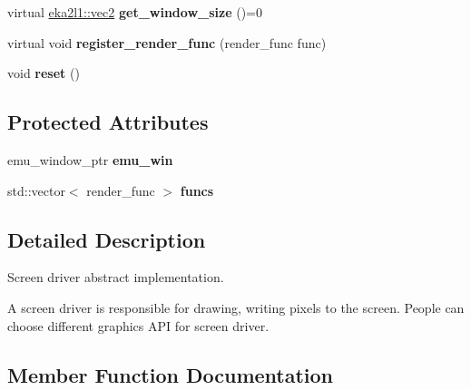 \begin{DoxyCompactItemize}
virtual \mbox{\hyperlink{structeka2l1_1_1vec2}{eka2l1\+::vec2}} {\bfseries get\+\_\+window\+\_\+size} ()=0
\item 
\mbox{\label{classeka2l1_1_1driver_1_1screen__driver_a4d6c1c80d242f6a8e75d8f965d2b4e0e}} 
virtual void {\bfseries register\+\_\+render\+\_\+func} (render\+\_\+func func)
\item 
\mbox{\label{classeka2l1_1_1driver_1_1screen__driver_a6b1f9b29f8c14ac82ea13cf240a180e8}} 
void {\bfseries reset} ()
\end{DoxyCompactItemize}
\subsection*{Protected Attributes}
\begin{DoxyCompactItemize}
\item 
\mbox{\label{classeka2l1_1_1driver_1_1screen__driver_aec066bc2fecf7cbcff867ac35f15dde9}} 
emu\+\_\+window\+\_\+ptr {\bfseries emu\+\_\+win}
\item 
\mbox{\label{classeka2l1_1_1driver_1_1screen__driver_a2b7e83b9510efa8dc35ae195c1df67fc}} 
std\+::vector$<$ render\+\_\+func $>$ {\bfseries funcs}
\end{DoxyCompactItemize}


\subsection{Detailed Description}
Screen driver abstract implementation. 

A screen driver is responsible for drawing, writing pixels to the screen. People can choose different graphics A\+PI for screen driver. 

\subsection{Member Function Documentation}
\mbox{\label{classeka2l1_1_1driver_1_1screen__driver_a8517ad66ef54e263f3ce38ac5fb34347}} 
